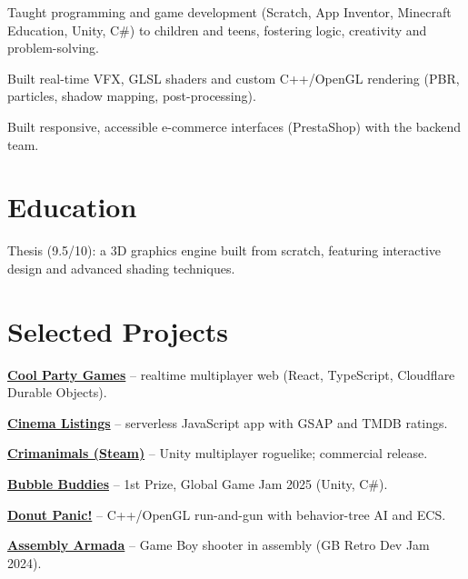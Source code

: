 \documentclass[10pt,a4paper]{article}
\begin{document}
\begin{cvitems}
  \item Taught programming and game development (Scratch, App Inventor, Minecraft Education, Unity, C\#) to children and teens, fostering logic, creativity and problem-solving.
\end{cvitems}
\entrygap

\begin{cvitems}
  \item Built real-time VFX, GLSL shaders and custom C++/OpenGL rendering (PBR, particles, shadow mapping, post-processing).
\end{cvitems}
\entrygap

\begin{cvitems}
  \item Built responsive, accessible e-commerce interfaces (PrestaShop) with the backend team.
\end{cvitems}

\section{Education}
\begin{cvitems}
  \item Thesis (9.5/10): a 3D graphics engine built from scratch, featuring interactive design and advanced shading techniques.
\end{cvitems}

\section{Selected Projects}
\begin{cvitems}
  \item \textbf{\href{https://cool-party-games.vercel.app}{Cool Party Games}} -- realtime multiplayer web (React, TypeScript, Cloudflare Durable Objects).
  \item \textbf{\href{https://films-reviewer.vercel.app}{Cinema Listings}} -- serverless JavaScript app with GSAP and TMDB ratings.
  \item \textbf{\href{https://store.steampowered.com/app/4004930/Crimanimals/}{Crimanimals (Steam)}} -- Unity multiplayer roguelike; commercial release.
  \item \textbf{\href{https://jsala.itch.io/bubblebuddies}{Bubble Buddies}} -- 1st Prize, Global Game Jam 2025 (Unity, C\#).
  \item \textbf{\href{https://eps.ua.es/es/ingenieria-multimedia/videojuegos/webs-grupos/curso-2024-25/grupo-icy-beak-studios-videojuego-donut-panic.html}{Donut Panic!}} -- C++/OpenGL run-and-gun with behavior-tree AI and ECS.
  \item \textbf{\href{https://itch.io/jam/gbretrodev24/rate/3055980}{Assembly Armada}} -- Game Boy shooter in assembly (GB Retro Dev Jam 2024).
\end{cvitems}
\end{document}
